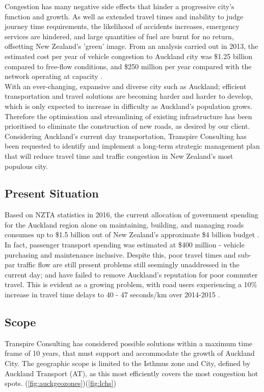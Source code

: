 \documentclass[twoside, a4paper, 11pt]{article}
\begin{document}
Congestion has many negative side effects that hinder a progressive city's function and growth. As well as extended travel times and inability to judge journey time requirements, the likelihood of accidents increases, emergency services are hindered, and large quantities of fuel are burnt for no return, offsetting New Zealand's 'green' image. From an analysis carried out in 2013, the estimated cost per year of vehicle congestion to Auckland city was \$1.25 billion compared to free-flow conditions, and \$250 million per year compared with the network operating at capacity \citep{wallis15}.\\

With an ever-changing, expansive and diverse city such as Auckland; efficient transportation and travel solutions are becoming harder and harder to develop, which is only expected to increase in difficulty as Auckland's population grows. Therefore the optimisation and streamlining of existing infrastructure has been prioritised to eliminate the construction of new roads, as desired by our client.\\

Considering Auckland's current day transportation, Transpire Consulting has been requested to identify and implement a long-term strategic management plan that will reduce travel time and traffic congestion in New Zealand's most populous city.

\subsection{Present Situation}
Based on NZTA statistics in 2016, the current allocation of government spending for the Auckland region alone on maintaining, building, and managing roads consumes up to \$1.5 billion out of New Zealand's approximate \$4 billion budget . In fact, passenger transport spending was estimated at \$400 million - vehicle purchasing and maintenance inclusive. Despite this, poor travel times and sub-par traffic flow are still present problems still seemingly unaddressed in the current day; and have failed to remove Auckland's reputation for poor commuter travel. This is evident as a growing problem, with road users experiencing a 10\% increase in travel time delays to 40 - 47 seconds/km over 2014-2015 \citep{transport16}.

\subsection{Scope}
Transpire Consulting has considered possible solutions within a maximum time frame of 10 years, that must support and accommodate the growth of Auckland City. The geographic scope is limited to the Isthmus zone and City, defined by Auckland Transport (AT), as this most efficiently covers the most congestion hot spots. (\cref{fig:auckgeozones})(\cref{fig:lchs})
\end{document}
